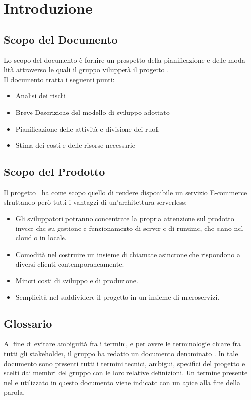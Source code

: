 \section{Introduzione}
\subsection{Scopo del Documento}
Lo scopo del documento è fornire un prospetto della pianificazione e delle moda-lità attraverso le quali il gruppo \Gruppo vilupperà il progetto \NomeProgetto.
\\ Il documento tratta i seguenti punti:
\begin{itemize}
    \item Analisi dei rischi
    \item Breve Descrizione del modello di sviluppo adottato
    \item Pianificazione delle attività e divisione dei ruoli
    \item Stima dei costi e delle risorse necessarie
\end{itemize}

\subsection{Scopo del Prodotto}
Il progetto \NomeProgetto\ ha come scopo quello di rendere disponibile un servizio
E-commerce sfruttando però tutti i vantaggi di un'architettura serverless:
\begin{itemize}
    \item Gli sviluppatori potranno concentrare la propria attenzione sul prodotto invece che su gestione e funzionamento di server e di runtime, che siano nel cloud o in locale.
    \item Comodità nel costruire un insieme di chiamate asincrone che rispondono a diversi clienti contemporaneamente.
    \item Minori costi di sviluppo e di produzione.
    \item Semplicità nel suddividere il progetto in un insieme di microservizi.
\end{itemize}

\subsection{Glossario}
Al fine di evitare ambiguità fra i termini, e per avere le terminologie chiare fra tutti gli stakeholder, il gruppo \Gruppo{} ha redatto un documento denominato .
In tale documento sono presenti tutti i termini tecnici, ambigui, specifici del progetto e scelti dai membri del gruppo con le loro relative definizioni.
Un termine presente nel  e utilizzato in questo documento viene indicato con un apice  alla fine della parola.

